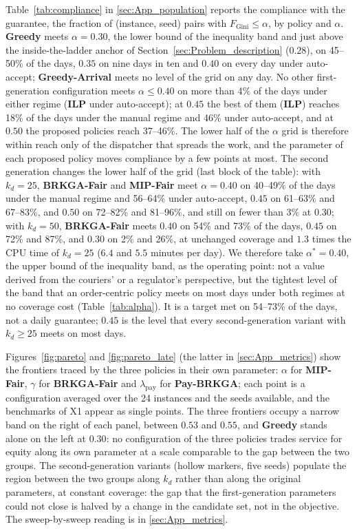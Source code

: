 \documentclass[a4paper,11pt,review,3p,authoryear]{elsarticle}
\newcommand{\FG}{F_{\text{Gini}}}
\begin{document}
Table~\ref{tab:compliance} in \ref{sec:App_population} reports the compliance with the guarantee, the fraction of (instance, seed) pairs with $\FG \le \alpha$, by policy and $\alpha$. \textbf{Greedy} meets $\alpha = 0.30$, the lower bound of the inequality band and just above the inside-the-ladder anchor of Section~\ref{sec:Problem_description} ($0.28$), on 45--50\% of the days, $0.35$ on nine days in ten and $0.40$ on every day under auto-accept; \textbf{Greedy-Arrival} meets no level of the grid on any day. No other first-generation configuration meets $\alpha \le 0.40$ on more than 4\% of the days under either regime (\textbf{ILP} under auto-accept); at $0.45$ the best of them (\textbf{ILP}) reaches 18\% of the days under the manual regime and 46\% under auto-accept, and at $0.50$ the proposed policies reach 37--46\%. The lower half of the $\alpha$ grid is therefore within reach only of the dispatcher that spreads the work, and the parameter of each proposed policy moves compliance by a few points at most. The second generation changes the lower half of the grid (last block of the table): with $k_d = 25$, \textbf{BRKGA-Fair} and \textbf{MIP-Fair} meet $\alpha = 0.40$ on 40--49\% of the days under the manual regime and 56--64\% under auto-accept, $0.45$ on 61--63\% and 67--83\%, and $0.50$ on 72--82\% and 81--96\%, and still on fewer than 3\% at $0.30$; with $k_d = 50$, \textbf{BRKGA-Fair} meets $0.40$ on 54\% and 73\% of the days, $0.45$ on 72\% and 87\%, and $0.30$ on 2\% and 26\%, at unchanged coverage and $1.3$ times the CPU time of $k_d = 25$ ($6.4$ and $5.5$ minutes per day). We therefore take $\alpha^* = 0.40$, the upper bound of the inequality band, as the operating point: not a value derived from the couriers' or a regulator's perspective, but the tightest level of the band that an order-centric policy meets on most days under both regimes at no coverage cost (Table~\ref{tab:alpha}). It is a target met on 54--73\% of the days, not a daily guarantee; $0.45$ is the level that every second-generation variant with $k_d \ge 25$ meets on most days.

Figures~\ref{fig:pareto} and \ref{fig:pareto_late} (the latter in \ref{sec:App_metrics}) show the frontiers traced by the three policies in their own parameter: $\alpha$ for \textbf{MIP-Fair}, $\gamma$ for \textbf{BRKGA-Fair} and $\lambda_{\text{pay}}$ for \textbf{Pay-BRKGA}; each point is a configuration averaged over the 24 instances and the seeds available, and the benchmarks of X1 appear as single points. The three frontiers occupy a narrow band on the right of each panel, between $0.53$ and $0.55$, and \textbf{Greedy} stands alone on the left at $0.30$: no configuration of the three policies trades service for equity along its own parameter at a scale comparable to the gap between the two groups. The second-generation variants (hollow markers, five seeds) populate the region between the two groups along $k_d$ rather than along the original parameters, at constant coverage: the gap that the first-generation parameters could not close is halved by a change in the candidate set, not in the objective. The sweep-by-sweep reading is in \ref{sec:App_metrics}.
\end{document}
